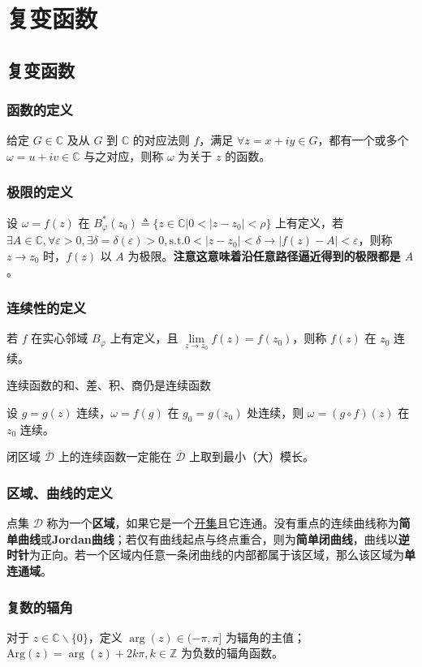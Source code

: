 \documentclass[./main.tex]{subfiles}
\begin{document}
\chapter{复变函数}
\section{复变函数}
\subsection{函数的定义}
给定 $G\in \mathbb{C}$ 及从 $G$ 到 $\mathbb{C}$ 的对应法则 $f$，满足 $\forall z=x+iy\in G$，都有一个或多个 $\omega=u+iv\in \mathbb{C}$ 与之对应，则称 $\omega$ 为关于 $z$ 的函数。
\subsection{极限的定义}
设 $\omega=f(z)$  在 $B_{\varphi}^*(z_0)\triangleq \{z\in\mathbb{C}{\big|}0<|z-z_0|<\rho\}$ 上有定义，若 $\exists A\in \mathbb{C},\forall \varepsilon>0,\exists\delta=\delta(\varepsilon)>0,\text{s.t.} 0<|z-z_0|<\delta\rightarrow |f(z)-A|<\varepsilon$，则称 $z\rightarrow z_0$ 时，$f(z)$ 以 $A$ 为极限。\textbf{注意这意味着沿任意路径逼近得到的极限都是 $A$}。
\subsection{连续性的定义}
若 $f$ 在实心邻域 $B_{\varphi}$ 上有定义，且 $\lim\limits_{z\rightarrow z_0}f(z)=f(z_0)$，则称 $f(z)$ 在 $z_0$ 连续。
\begin{enumerate*}
    \item 连续函数的和、差、积、商仍是连续函数
    \item 设 $g=g(z)$ 连续，$\omega=f(g)$ 在 $g_0=g(z_0)$ 处连续，则 $\omega=(g\circ f)(z)$ 在 $z_0$ 连续。
    \item 闭区域 $\overline{\mathscr{D}}$ 上的连续函数一定能在 $\overline{\mathscr{D}}$ 上取到最小（大）模长。
\end{enumerate*}
\subsection{区域、曲线的定义}
点集 $\mathscr{D}$ 称为一个\textbf{区域}，如果它是一个\underline{开集}且它连通。没有重点的连续曲线称为\textbf{简单曲线}或\textbf{Jordan曲线}；若仅有曲线起点与终点重合，则为\textbf{简单闭曲线}，曲线以\textbf{\color{red}逆时针}为正向。若一个区域内任意一条闭曲线的内部都属于该区域，那么该区域为\textbf{单连通域}。
\subsection{复数的辐角}
对于 $z\in\mathbb{C}\backslash\{0\}$，定义 {\color{red}$\arg(z)\in (-\pi,\pi]$} 为辐角的主值；$\text{Arg}(z)=\arg(z)+2k\pi,k\in\mathbb{Z}$ 为负数的辐角函数。
\end{document}
